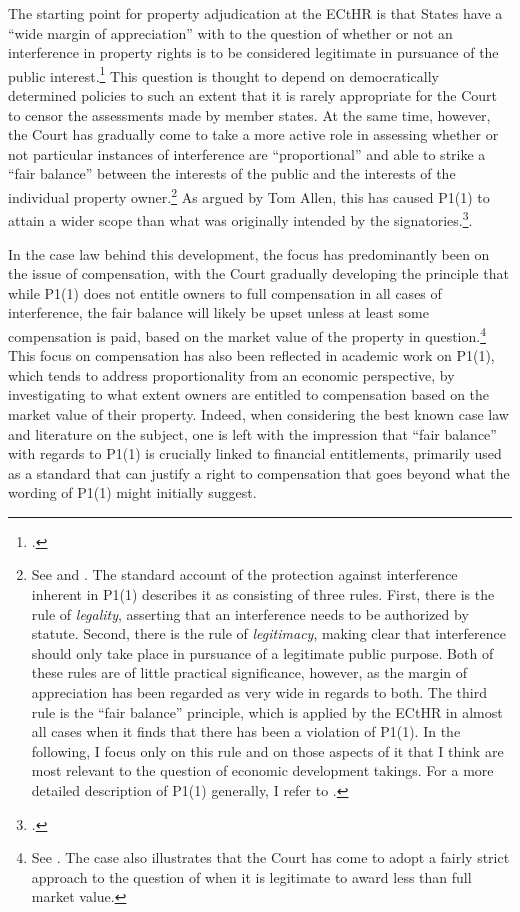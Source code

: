 The starting point for property adjudication at the ECtHR is that States have a ``wide margin of appreciation'' with  to the question of whether or not an interference in property rights is to be considered legitimate in pursuance of the public interest.\footcite[See][54]{james86} This question is thought to depend on democratically determined policies to such an extent that it is rarely appropriate for the Court to censor the assessments made by member states. At the same time, however, the Court has gradually come to take a more active role in assessing whether or not particular instances of interference are ``proportional'' and able to strike a ``fair balance'' between the interests of the public and the interests of the individual property owner.\footnote{See \cite[69]{sporrong82} and \cite[120]{james86}. The standard account of the protection against interference inherent in P1(1) describes it as consisting of three rules. First, there is the rule of {\it legality}, asserting that an interference needs to be authorized by statute. Second, there is the rule of {\it legitimacy}, making clear that interference should only take place in pursuance of a legitimate public purpose. Both of these rules are of little practical significance, however, as the margin of appreciation has been regarded as very wide in regards to both. The third rule is the ``fair balance'' principle, which is applied by the ECtHR in almost all cases when it finds that there has been a violation of P1(1). In the following, I focus only on this rule and on those aspects of it that I think are most relevant to the question of economic development takings. For a more detailed description of P1(1) generally, I refer to \cite{allen05}.} As argued by Tom Allen, this has caused P1(1) to attain a wider scope than what was originally intended by the signatories.\footcite[1055]{allen10}.

In the case law behind this development, the focus has predominantly been on the issue of compensation, with the Court gradually developing the principle that while P1(1) does not entitle owners to full compensation in all cases of interference, the fair balance will likely be upset unless at least some compensation is paid, based on the market value of the property in question.\footnote{See \cite[103]{scordino06}. The case also illustrates that the Court has come to adopt a fairly strict approach to the question of when it is legitimate to award less than full market value.} This focus on compensation has also been reflected in academic work on P1(1), which tends to address proportionality from an economic perspective, by investigating to what extent owners are entitled to compensation based on the market value of their property. Indeed, when considering the best known case law and literature on the subject, one is left with the impression that ``fair balance'' with regards to P1(1) is crucially linked to financial entitlements, primarily used as a standard that can justify a right to compensation that goes beyond what the wording of P1(1) might initially suggest.

